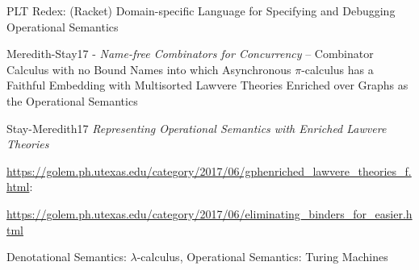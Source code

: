 PLT Redex: (Racket) Domain-specific Language for Specifying and
Debugging Operational Semantics

Meredith-Stay17 - \emph{Name-free Combinators for Concurrency} --
Combinator Calculus with no Bound Names into which Asynchronous
$\pi$-calculus has a Faithful Embedding with Multisorted Lawvere
Theories Enriched over Graphs as the Operational Semantics

Stay-Meredith17 \emph{Representing Operational Semantics with Enriched
Lawvere Theories}

\url{https://golem.ph.utexas.edu/category/2017/06/gphenriched_lawvere_theories_f.html}:

\url{https://golem.ph.utexas.edu/category/2017/06/eliminating_binders_for_easier.html}

Denotational Semantics: $\lambda$-calculus, Operational Semantics:
Turing Machines

